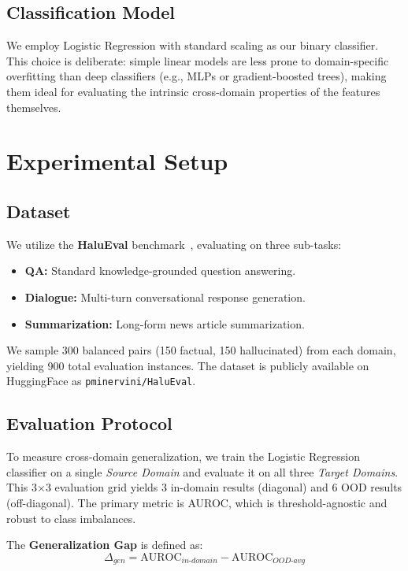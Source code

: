 \documentclass[conference]{IEEEtran}
\begin{document}
\subsection{Classification Model}

We employ Logistic Regression with standard scaling as our binary classifier. This choice is deliberate: simple linear models are less prone to domain-specific overfitting than deep classifiers (e.g., MLPs or gradient-boosted trees), making them ideal for evaluating the intrinsic cross-domain properties of the features themselves.

\section{Experimental Setup}

\subsection{Dataset}
We utilize the \textbf{HaluEval} benchmark~\cite{li2023halueval}, evaluating on three sub-tasks:
\begin{itemize}
    \item \textbf{QA:} Standard knowledge-grounded question answering.
    \item \textbf{Dialogue:} Multi-turn conversational response generation.
    \item \textbf{Summarization:} Long-form news article summarization.
\end{itemize}

We sample 300 balanced pairs (150 factual, 150 hallucinated) from each domain, yielding 900 total evaluation instances. The dataset is publicly available on HuggingFace as \texttt{pminervini/HaluEval}.

\subsection{Evaluation Protocol}
To measure cross-domain generalization, we train the Logistic Regression classifier on a single \textit{Source Domain} and evaluate it on all three \textit{Target Domains}. This 3$\times$3 evaluation grid yields 3 in-domain results (diagonal) and 6 OOD results (off-diagonal). The primary metric is AUROC, which is threshold-agnostic and robust to class imbalances.

The \textbf{Generalization Gap} is defined as:
\begin{equation}
\Delta_{gen} = \text{AUROC}_{in\text{-}domain} - \text{AUROC}_{OOD\text{-}avg}
\end{equation}
\end{document}

